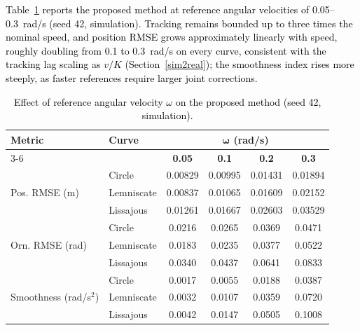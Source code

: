 \documentclass[preprint,12pt]{elsarticle}
\begin{document}
\textcolor{black}{Table~\ref{tab:speed} reports the proposed method at reference angular velocities of 0.05--0.3~rad/s (seed 42, simulation). Tracking remains bounded up to three times the nominal speed, and position RMSE grows approximately linearly with speed, roughly doubling from 0.1 to 0.3~rad/s on every curve, consistent with the tracking lag scaling as $v/K$ (Section~\ref{sim2real}); the smoothness index rises more steeply, as faster references require larger joint corrections.}

\begin{table}[!htbp]
\centering
\caption{\textcolor{black}{Effect of reference angular velocity $\omega$ on the proposed method (seed 42, simulation).}}
\label{tab:speed}
\footnotesize
\color{black}
\renewcommand{\arraystretch}{1.0}
\setlength{\tabcolsep}{4pt}
\begin{tabular}{llcccc}
\toprule
\textbf{Metric} & \textbf{Curve} & \multicolumn{4}{c}{$\boldsymbol{\omega}$ \textbf{(rad/s)}} \\
\cmidrule(lr){3-6}
 & & \textbf{0.05} & \textbf{0.1} & \textbf{0.2} & \textbf{0.3} \\
\midrule
\multirow{3}{*}{Pos. RMSE (m)} & Circle     & 0.00829 & 0.00995 & 0.01431 & 0.01894 \\
                               & Lemniscate & 0.00837 & 0.01065 & 0.01609 & 0.02152 \\
                               & Lissajous  & 0.01261 & 0.01667 & 0.02603 & 0.03529 \\
\midrule
\multirow{3}{*}{Orn. RMSE (rad)} & Circle     & 0.0216 & 0.0265 & 0.0369 & 0.0471 \\
                                 & Lemniscate & 0.0183 & 0.0235 & 0.0377 & 0.0522 \\
                                 & Lissajous  & 0.0340 & 0.0437 & 0.0641 & 0.0833 \\
\midrule
\multirow{3}{*}{Smoothness (rad/s$^2$)} & Circle     & 0.0017 & 0.0055 & 0.0188 & 0.0387 \\
                                        & Lemniscate & 0.0032 & 0.0107 & 0.0359 & 0.0720 \\
                                        & Lissajous  & 0.0042 & 0.0147 & 0.0505 & 0.1008 \\
\bottomrule
\end{tabular}
\end{table}
\end{document}
